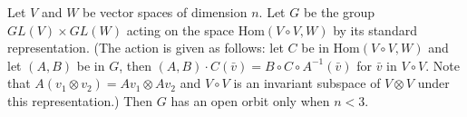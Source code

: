 Let $V$ and $W$ be vector spaces of dimension $n$. Let $G$ be the group $GL(V) \times GL(W)$ acting on the space $\text{Hom}(V \circ V, W)$ by its standard representation. (The action is given as follows: let $C$ be in $\text{Hom}(V \circ V, W)$ and let $(A, B)$ be in $G$, then $(A, B) \cdot C(\bar{v}) = B \circ C \circ A^{-1}(\bar{v})$ for $\bar{v}$ in $V \circ V$. Note that $A(v_1 \otimes v_2) = Av_1 \otimes Av_2$ and $V \circ V$ is an invariant subspace of $V \otimes V$ under this representation.) Then $G$ has an open orbit only when $n < 3$.
